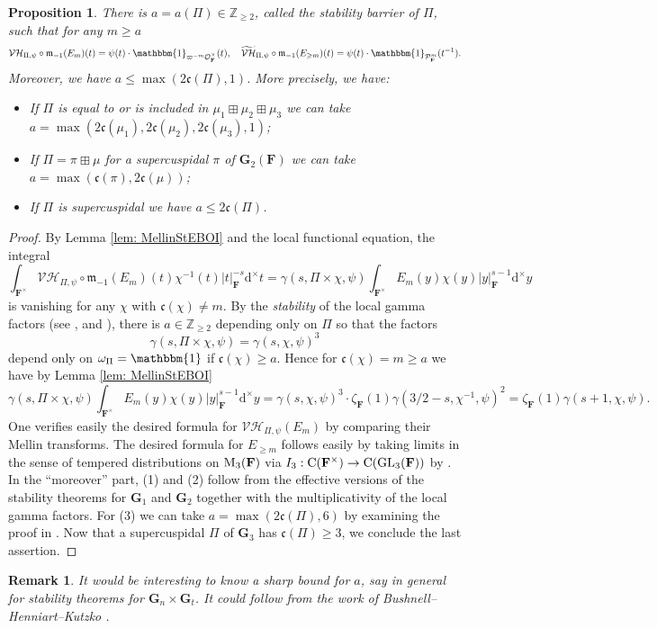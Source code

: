 \documentclass[A4]{amsart}
\def\leq{\leqslant}
\def\geq{\geqslant}
\newtheorem{proposition}[theorem]{Proposition}
\newtheorem{remark} [theorem] {Remark}
\numberwithin{equation}{section} \everymath{\displaystyle}
\newcommand{\Cont}{{\rm C}}
\newcommand{\gp}[1]{\mathbf{#1}}
\newcommand{\GL}{{\rm GL}}
\newcommand{\Z}{\mathbb{Z}}
\newcommand{\Mat}{{\rm M}}
\newcommand{\id}{\mathbbm{1}}
\newcommand{\ud}{\mathrm{d}}
\newcommand{\F}{\mathbf{F}}
\newcommand{\vO}{\mathcal{O}}
\newcommand{\vP}{\mathcal{P}}
\newcommand{\norm}[1][\cdot]{\lvert #1 \rvert}
\newcommand{\Mult}{\mathfrak{m}}
\newcommand{\VorH}{\mathcal{VH}}
\newcommand{\cond}{\mathfrak{c}}
\begin{document}
\begin{proposition} \label{prop: StabRang}
	There is $a = a(\Pi) \in \Z_{\geq 2}$, called the \emph{stability barrier} of $\Pi$, such that for any $m \geq a$
	$$ \VorH_{\Pi,\psi} \circ \Mult_{-1}(E_m)(t) = \psi(t) \cdot \id_{\varpi^{-m} \vO_{\F}^{\times}}(t), \quad \widetilde{\VorH}_{\Pi,\psi} \circ \Mult_{-1}(E_{\geq m})(t) = \psi(t) \cdot \id_{\vP_{\F}^m}(t^{-1}). $$
	Moreover, we have $a \leq \max(2\cond(\Pi), 1)$. More precisely, we have:
\begin{itemize}
	\item[(1)] If $\Pi$ is equal to or is included in $\mu_1 \boxplus \mu_2 \boxplus \mu_3$ we can take $a = \max(2\cond(\mu_1), 2\cond(\mu_2), 2\cond(\mu_3),1)$;
	\item[(2)] If $\Pi = \pi \boxplus \mu$ for a supercuspidal $\pi$ of $\gp{G}_2(\F)$ we can take $a = \max(\cond(\pi), 2\cond(\mu))$;
	\item[(3)] If $\Pi$ is supercuspidal we have $a \leq 2 \cond(\Pi)$.
\end{itemize}
\end{proposition}
\begin{proof}
	By Lemma \ref{lem: MellinStEBOI} and the local functional equation, the integral
	$$ \int_{\F^{\times}} \VorH_{\Pi,\psi} \circ \Mult_{-1}(E_m)(t) \chi^{-1}(t) \norm[t]_{\F}^{-s} \ud^{\times}t = \gamma(s, \Pi \times \chi, \psi) \int_{\F^{\times}} E_m(y) \chi(y) \norm[y]_{\F}^{s-1} \ud^{\times}y $$
is vanishing for any $\chi$ with $\cond(\chi) \neq m$. By the \emph{stability} of the local gamma factors (see \cite[Proposition (2.2)]{JS85}, \cite[Theorem 23.8]{BuH06} and \cite[Exercise 23.5]{BuH06}), there is $a \in \Z_{\geq 2}$ depending only on $\Pi$ so that the factors 
	$$ \gamma(s, \Pi \times \chi, \psi) = \gamma(s, \chi, \psi)^3 $$ 
depend only on $\omega_{\Pi} = \id$ if $\cond(\chi) \geq a$. Hence for $\cond(\chi)=m \geq a$ we have by Lemma \ref{lem: MellinStEBOI}
	$$ \gamma(s, \Pi \times \chi, \psi) \int_{\F^{\times}} E_m(y) \chi(y) \norm[y]_{\F}^{s-1} \ud^{\times}y = \gamma(s, \chi, \psi)^3 \cdot \zeta_{\F}(1) \gamma(3/2-s,\chi^{-1},\psi)^2 = \zeta_{\F}(1) \gamma(s+1,\chi,\psi). $$
	One verifies easily the desired formula for $\VorH_{\Pi,\psi}(E_m)$ by comparing their Mellin transforms. The desired formula for $E_{\geq m}$ follows easily by taking limits in the sense of tempered distributions on $\Mat_3(\F)$ via $I_3: \Cont(\F^{\times}) \to \Cont(\GL_3(\F))$ by \cite[Theorem 1.3]{Wu24+}. In the ``moreover'' part, (1) and (2) follow from the effective versions of the stability theorems for $\gp{G}_1$ and $\gp{G}_2$ \cite[Theorem 23.8 \& 25.7]{BuH06} together with the multiplicativity of the local gamma factors. For (3) we can take $a = \max(2\cond(\Pi),6)$ by examining the proof in \cite[\S 2]{JS85}. Now that a supercuspidal $\Pi$ of $\gp{G}_3$ has $\cond(\Pi) \geq 3$, we conclude the last assertion.
\end{proof}
\begin{remark}
	It would be interesting to know a sharp bound for $a$, say in general for stability theorems for $\gp{G}_n \times \gp{G}_t$. It could follow from the work of Bushnell--Henniart--Kutzko \cite{BHK98}.
\end{remark}
\end{document}
